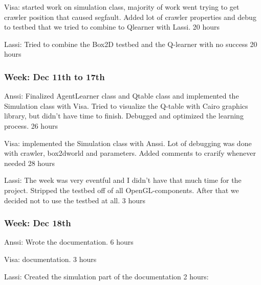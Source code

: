 \documentclass{article}
\begin{document}
Visa:
started work on simulation class, majority of work went trying to get crawler
position that caused segfault. Added lot of crawler properties and debug to testbed
that we tried to combine to Qlearner with Lassi.
20 hours

Lassi: Tried to combine the Box2D testbed and the Q-learner with no success
20 hours

\subsubsection{Week: Dec 11th to 17th}
Anssi:
Finalized AgentLearner class and Qtable class and implemented the
Simulation class with Visa. Tried to visualize the Q-table with
Cairo graphics library, but didn’t have time to finish. Debugged
and optimized  the learning process.
26 hours

Visa:
implemented the Simulation class with Anssi. Lot of debugging was done with
crawler, box2dworld and parameters. Added comments to crarify whenever needed
28 hours

Lassi:
The week was very eventful and I didn't have that much time for the project.
Stripped the testbed off of all OpenGL-components. After that we decided not
to use the testbed at all.
3 hours

\subsubsection{Week: Dec 18th}
Anssi:
Wrote the documentation.
6 hours

Visa:
documentation.
3 hours

Lassi:
Created the simulation part of the documentation
2 hours:
\end{document}
